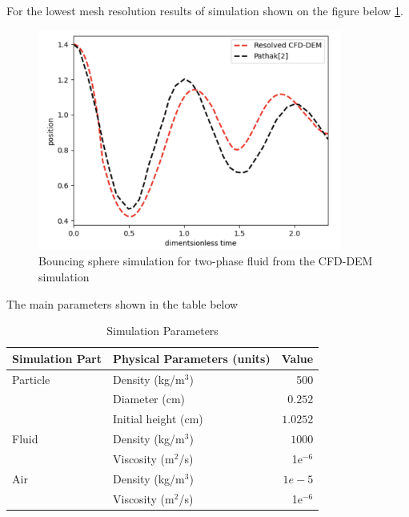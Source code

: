For the lowest mesh resolution results of simulation shown on the figure below \ref{fig:2ph_exp}.
\begin{figure}[!ht]
    \centering
    \includegraphics[width=10cm]{Images/chap4/bouncing_sphere_plot.png}
    \caption{Bouncing sphere simulation for two-phase fluid from the CFD-DEM simulation}
    \label{fig:2ph_exp}
    \end{figure}
The main parameters shown in the table below
\begin{table}[ht]
    \centering
    \caption{Simulation Parameters} \label{table2-chap4}
    \begin{tabular}{llr}
        \toprule
        \hline
        Simulation Part         & Physical Parameters (units) & Value \\
        \hline
        \midrule
        Particle                 & Density (kg/m$^3$)          & 500    \\
                         & Diameter (cm)          & $0.252$    \\
                         & Initial height (cm)          & $1.0252$    \\
                         \hline
        Fluid                  & Density (kg/m$^3$)           & $1000$   \\
                                & Viscosity (m$^2$/s)         & 1e$^{-6}$    \\
                                \hline
         Air                  & Density (kg/m$^3$)           & $1e-5$   \\
                                & Viscosity (m$^2$/s)         & 1e$^{-6}$    \\
                                \hline
        \bottomrule
     \end{tabular}
\end{table}


